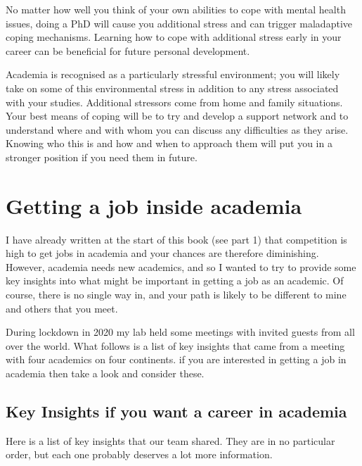 \documentclass[
]{krantz}
\begin{document}
No matter how well you think of your own abilities to cope with mental health issues, doing a PhD will cause you additional stress and can trigger maladaptive coping mechanisms. Learning how to cope with additional stress early in your career can be beneficial for future personal development.

Academia is recognised as a particularly stressful environment; you will likely take on some of this environmental stress in addition to any stress associated with your studies. Additional stressors come from home and family situations. Your best means of coping will be to try and develop a support network and to understand where and with whom you can discuss any difficulties as they arise. Knowing who this is and how and when to approach them will put you in a stronger position if you need them in future.

\hypertarget{jobinacademia}{%
\chapter{Getting a job inside academia}\label{jobinacademia}}

I have already written at the start of this book (see part 1) that competition is high to get jobs in academia and your chances are therefore diminishing. However, academia needs new academics, and so I wanted to try to provide some key insights into what might be important in getting a job as an academic. Of course, there is no single way in, and your path is likely to be different to mine and others that you meet.

During lockdown in 2020 my lab held some meetings with invited guests from all over the world. What follows is a list of key insights that came from a meeting with four academics on four continents. if you are interested in getting a job in academia then take a look and consider these.

\hypertarget{key-insights-if-you-want-a-career-in-academia}{%
\section{Key Insights if you want a career in academia}\label{key-insights-if-you-want-a-career-in-academia}}

Here is a list of key insights that our team shared. They are in no particular order, but each one probably deserves a lot more information.
\end{document}
